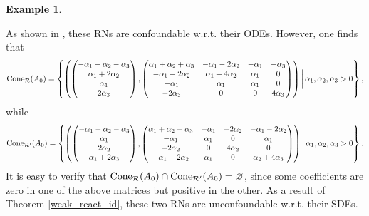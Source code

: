 \documentclass[10pt,a4paper]{amsart}
\let\emptyset\varnothing
\theoremstyle{definition}
\newtheorem{example}[theorem]{Example}
\theoremstyle{remark}
\theoremstyle{consequence}
\numberwithin{equation}{section}
\begin{document}
\begin{example}
\begin{center}
\begin{tikzpicture}
\end{tikzpicture}
\end{center}
As shown in \cite{craciun}, these RNs are confoundable w.r.t. their ODEs. 
However, one finds that
    \begin{equation*}
        {\rm Cone}_\mathcal{R}(A_0) = \left\{\left(\begin{pmatrix}
            -\alpha_1-\alpha_2 -\alpha_3 \\
            \alpha_1+2\alpha_2\\
            \alpha_1\\
            2\alpha_3
        \end{pmatrix},\begin{pmatrix}
\alpha_1+\alpha_2+\alpha_3 & -\alpha_1-2 \alpha_2 & -\alpha_1  & -\alpha_3 \\
-\alpha_1-2\alpha_2   & \alpha_1+4\alpha_2 & \alpha_1  & 0\\
 -\alpha_1 & \alpha_1  &  \alpha_1& 0 \\
 -2\alpha_3 & 0 & 0 & 4 \alpha_3
\end{pmatrix}\right) \bigg|\, \alpha_1, \alpha_2, \alpha_3 >0 \right\} ,
    \end{equation*}
    while
    \begin{equation*}
        {\rm Cone}_\mathcal{R'}(A_0) = \left\{\left(\begin{pmatrix}
            -\alpha_1-\alpha_2 -\alpha_3 \\
            \alpha_1\\
            2\alpha_2\\
            \alpha_1+2\alpha_3
        \end{pmatrix},\begin{pmatrix}
\alpha_1+\alpha_2+\alpha_3 & -\alpha_1 & -2\alpha_2 & -\alpha_1-2\alpha_2\\
-\alpha_1 & \alpha_1& 0 & \alpha_1 \\
 -2\alpha_2 & 0  &  4\alpha_2& 0 \\
 -\alpha_1-2\alpha_2 & \alpha_1& 0 & \alpha_2+4\alpha_3
\end{pmatrix}\right) \bigg| \, \alpha_1,\alpha_2, \alpha_3 >0  \right\} .
    \end{equation*}
    It is easy to verify that ${\rm Cone}_\mathcal{R}(A_0) \cap {\rm Cone}_\mathcal{R'}(A_0) = \emptyset$, since some coefficients are zero in one of the above matrices but positive in the other.
    As a result of Theorem \ref{weak_react_id}, these two RNs are unconfoundable w.r.t. their SDEs.
\end{example}
\end{document}
